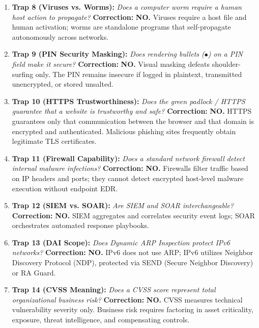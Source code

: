 \begin{enumerate}
\item \textbf{Trap 8 (Viruses vs. Worms):} \textit{Does a computer worm require a human host action to propagate?} \newline
\textbf{Correction:} \textbf{NO.} Viruses require a host file and human activation; worms are standalone programs that self-propagate autonomously across networks.
\item \textbf{Trap 9 (PIN Security Masking):} \textit{Does rendering bullets ($\bullet$) on a PIN field make it secure?} \newline
\textbf{Correction:} \textbf{NO.} Visual masking defeats shoulder-surfing only. The PIN remains insecure if logged in plaintext, transmitted unencrypted, or stored unsalted.
\item \textbf{Trap 10 (HTTPS Trustworthiness):} \textit{Does the green padlock / HTTPS guarantee that a website is trustworthy and safe?} \newline
\textbf{Correction:} \textbf{NO.} HTTPS guarantees only that communication between the browser and that domain is encrypted and authenticated. Malicious phishing sites frequently obtain legitimate TLS certificates.
\item \textbf{Trap 11 (Firewall Capability):} \textit{Does a standard network firewall detect internal malware infections?} \newline
\textbf{Correction:} \textbf{NO.} Firewalls filter traffic based on IP headers and ports; they cannot detect encrypted host-level malware execution without endpoint EDR.
\item \textbf{Trap 12 (SIEM vs. SOAR):} \textit{Are SIEM and SOAR interchangeable?} \newline
\textbf{Correction:} \textbf{NO.} SIEM aggregates and correlates security event logs; SOAR orchestrates automated response playbooks.
\item \textbf{Trap 13 (DAI Scope):} \textit{Does Dynamic ARP Inspection protect IPv6 networks?} \newline
\textbf{Correction:} \textbf{NO.} IPv6 does not use ARP; IPv6 utilizes Neighbor Discovery Protocol (NDP), protected via SEND (Secure Neighbor Discovery) or RA Guard.
\item \textbf{Trap 14 (CVSS Meaning):} \textit{Does a CVSS score represent total organizational business risk?} \newline
\textbf{Correction:} \textbf{NO.} CVSS measures technical vulnerability severity only. Business risk requires factoring in asset criticality, exposure, threat intelligence, and compensating controls.

\end{enumerate}
